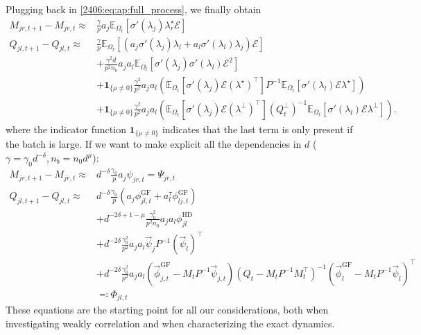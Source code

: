 Plugging back in \eqref{2406:eq:ap:full_process}, we finally obtain
\begin{align*}
M_{jr,t+1} - M_{jr,t} \approx&  \frac{\gamma}{p}a_j \mathbb{E}_{\Omega_t}\left[ \sigma'(\lambda_j)\lambda^{\star}_{r} \mathcal{E} \right]\\
Q_{jl,t+1} - Q_{jl,t} \approx& \frac{\gamma}{p}\mathbb{E}_{\Omega_t}\left[\left(a_j\sigma'(\lambda_j)\lambda_{l}+a_l\sigma'(\lambda_{l})\lambda_{j}\right)\mathcal{E}\right]  \\
    &+\frac{\gamma^2d}{p^2n_b}a_j a_l	\mathbb{E}_{\Omega_t}\left[ \sigma'(\lambda_j)\sigma'(\lambda_l)\mathcal{E}^2  \right] \\
    &+\mathbf{1}_{\{\mu\neq0\}}\frac{\gamma^2}{p^2} a_j a_l
        \left(\mathbb{E}_{\Omega_t}\left[\sigma'(\lambda_j)\mathcal E \left(\lambda^\star\right)^\top\right]P^{-1}\mathbb{E}_{\Omega_t}\left[\sigma'(\lambda_l)\mathcal E \lambda^\star\right] \right)
     \\
    &+\mathbf{1}_{\{\mu\neq0\}}\frac{\gamma^2}{p^2} a_j a_l\left(\mathbb{E}_{\Omega_t}\left[\sigma'(\lambda_j)\mathcal E (\lambda^\bot)^\top\right]\left(Q_t^\bot\right)^{-1}\mathbb{E}_{\Omega_t}\left[\sigma'(\lambda_l)\mathcal E \lambda^\bot\right]\right).
\end{align*}
where the indicator function \(\mathbf{1}_{\{\mu\neq0\}}\) indicates that the last term is only present if the batch is large. If we want to make explicit all the dependencies in \(d\) (\(\gamma = \gamma_0 d^{-\delta}, n_b= n_0 d^\mu\)):
\begin{equation} \label{2406:eq:app:process}\begin{split}
M_{jr,t+1} - M_{jr,t} \approx&  d^{-\delta}\frac{\gamma_0}{p}a_j \psi_{jr,t} = \Psi_{jr,t}\\
Q_{jl,t+1} - Q_{jl,t} \approx& d^{-\delta}\frac{\gamma_0}{p}\left(a_j\phi_{jl,t}^\text{GF} + a_l^\tau\phi_{lj,t}^\text{GF}\right)  \\
    &+d^{-2\delta+1-\mu}\frac{\gamma_0^2}{p^2n_0}a_j a_l \phi^\text{HD}_{jl} \\
    &+d^{-2\delta}\frac{\gamma_0^2}{p^2} a_j a_l \vec \psi_{j} P^{-1} (\vec\psi_{l})^\top\\
    &+d^{-2\delta}\frac{\gamma_0^2}{p^2} a_j a_l \left(\vec\phi_{j,t}^\text{GF} - M_tP^{-1}\vec \psi_{j,t}\right)(Q_t - M_tP^{-1}M_t^\top)^{-1}\left(\vec\phi^\text{GF}_l - M_tP^{-1}\vec \psi_{l}\right)^\top \\ &\eqqcolon \Phi_{jl,t}
\end{split}\end{equation}
These equations are the starting point for all our considerations, both when investigating weakly correlation and when characterizing the exact dynamics.

